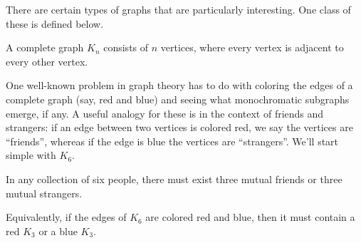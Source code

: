\documentclass[../m055main.tex]{subfiles}
\begin{document}
There are certain types of graphs that are particularly interesting.
One class of these is defined below.

\begin{definition}
    A complete graph $K_n$ consists of $n$ vertices, where every vertex is adjacent to every other vertex.
\end{definition}

One well-known problem in graph theory has to do with coloring the edges of a complete graph (say, red and blue) and seeing what monochromatic subgraphs emerge, if any.
A useful analogy for these is in the context of friends and strangers: if an edge between two vertices is colored red, we say the vertices are ``friends'', whereas if the edge is blue the vertices are ``strangers''.
We'll start simple with $K_6$.

\begin{theorem}
    In any collection of six people, there must exist three mutual friends or three mutual strangers.

    Equivalently, if the edges of $K_6$ are colored red and blue, then it must contain a red $K_3$ or a blue $K_3$.
\end{theorem}
\end{document}
